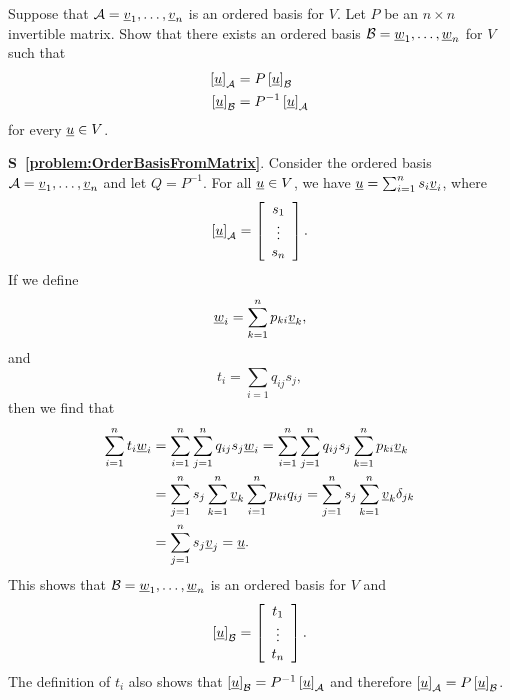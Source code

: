 \begin{problem} \label{problem:OrderBasisFromMatrix}
Suppose that $\mathcal{A} = \underline{v}_1, \ldots, \underline{v}_n$ is an ordered basis for $V$.
Let $P$ be an $n \times n$ invertible matrix.
Show that there exists an ordered basis $\mathcal{B} = \underline{w}_1, \ldots, \underline{w}_n$ for $V$ such that
\begin{align*}
\left[ \underline{u} \right]_{\mathcal{A}} &= P \left[ \underline{u} \right]_{\mathcal{B}} \\
\left[ \underline{u} \right]_{\mathcal{B}} &= P^{-1} \left[ \underline{u} \right]_{\mathcal{A}}
\end{align*}
for every $\underline{u} \in V$.
\end{problem}
\textbf{S~\ref{problem:OrderBasisFromMatrix}}.
Consider the ordered basis $\mathcal{A} = \underline{v}_1, \ldots, \underline{v}_n$ and let $Q = P^{-1}$.
For all $\underline{u} \in V$, we have $\underline{u} = \sum_{i=1}^n s_i \underline{v}_i$, where
\begin{equation*}
\left[ \underline{u} \right]_{\mathcal{A}} = \left[ \begin{array}{c} s_1 \\ \vdots \\ s_n \end{array} \right].
\end{equation*}
If we define
\begin{equation*}
\underline{w}_i = \sum_{k = 1}^n p_{ki} \underline{v}_k,
\end{equation*}
and
\begin{equation*}
t_i = \sum_{i=1} q_{ij} s_j,
\end{equation*}
then we find that
\begin{equation*}
\begin{split}
\sum_{i = 1}^n t_i \underline{w}_i
&= \sum_{i = 1}^n \sum_{j=1}^n q_{ij} s_j \underline{w}_i
= \sum_{i = 1}^n \sum_{j=1}^n q_{ij} s_j \sum_{k = 1}^n p_{ki} \underline{v}_k \\
& = \sum_{j=1}^n s_j \sum_{k=1}^n \underline{v}_k \sum_{i = 1}^n p_{ki} q_{ij}
= \sum_{j=1}^n s_j \sum_{k=1}^n \underline{v}_k \delta_{jk} \\
& = \sum_{j=1}^n s_j \underline{v}_j
= \underline{u}.
\end{split}
\end{equation*}
This shows that $\mathcal{B} = \underline{w}_1, \ldots, \underline{w}_n$ is an ordered basis for $V$ and
\begin{equation*}
\left[ \underline{u} \right]_{\mathcal{B}} = \left[ \begin{array}{c} t_1 \\ \vdots \\ t_n \end{array} \right].
\end{equation*}
The definition of $t_i$ also shows that $\left[ \underline{u} \right]_{\mathcal{B}} = P^{-1} \left[ \underline{u} \right]_{\mathcal{A}}$ and therefore $\left[ \underline{u} \right]_{\mathcal{A}} = P \left[ \underline{u} \right]_{\mathcal{B}}$.



